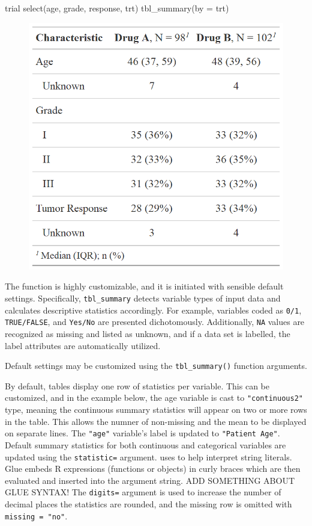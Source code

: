 \begin{example}
trial %
  select(age, grade, response, trt) %
  tbl_summary(by = trt)
\end{example}
\begin{figure}[h!]
  \includegraphics[scale=0.28]{summary_basic.png}
  \centering
\end{figure}

The function is highly customizable, and it is initiated with sensible default settings.
Specifically, \texttt{tbl\_summary} detects variable types of input data and calculates descriptive statistics accordingly.
For example, variables coded as \texttt{0/1}, \texttt{TRUE/FALSE}, and \texttt{Yes/No} are presented dichotomously.
Additionally, \texttt{NA} values are recognized as missing and listed as unknown, and if a data set is labelled, the label attributes are automatically utilized. 

Default settings may be customized using the \texttt{tbl\_summary()} function arguments.



By default, tables display one row of statistics per variable. This can be customized, and in the example below, the age variable is cast to \texttt{"continuous2"} type, meaning the continuous summary statistics will appear on two or more rows in the table. This allows the numner of non-missing and the mean to be displayed on separate lines.
The \texttt{"age"} variable's label is updated to \texttt{"Patient Age"}.
Default summary statistics for both continuous and categorical variables are updated using the \texttt{statistic=} argument. 
 uses  to help interpret string literals. Glue embeds R expressions (functions or objects) in curly braces which are then evaluated and inserted into the argument string. 
ADD SOMETHING ABOUT GLUE SYNTAX!
The \texttt{digits=} argument is used to increase the number of decimal places the statistics are rounded, and the missing row is omitted with \texttt{missing = "no"}.

